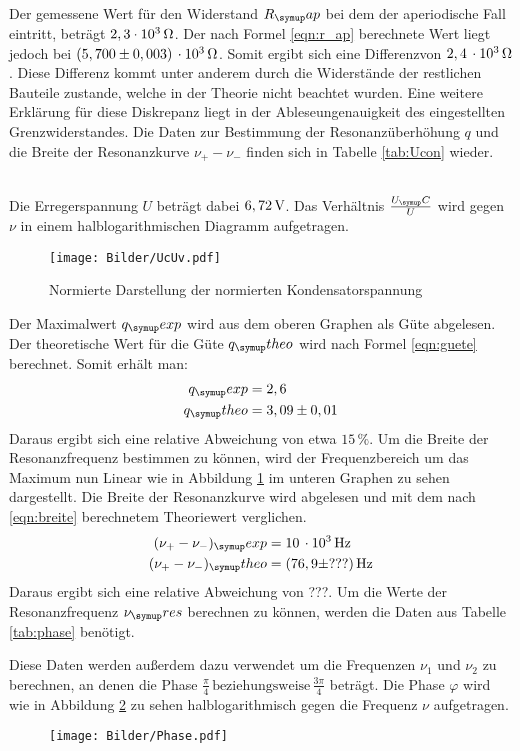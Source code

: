 Der gemessene Wert für den Widerstand $R_\su{ap}$ bei dem der aperiodische Fall
eintritt, beträgt $2,3\cdot 10^3 \,\si{\ohm}$. Der nach Formel \eqref{eqn:r_ap}
berechnete Wert liegt jedoch bei $(5,700 \pm 0,003)\,\cdot 10^3\,\si{\ohm}$. Somit ergibt
sich eine Differenzvon $2,4\,\cdot10^3 \,\si{\ohm}$. Diese Differenz kommt unter anderem durch die Widerstände der
restlichen Bauteile zustande, welche in der Theorie nicht beachtet wurden.
Eine weitere Erklärung für diese Diskrepanz liegt in der Ableseungenauigkeit
des eingestellten Grenzwiderstandes.
\newpage
Die Daten zur Bestimmung der Resonanzüberhöhung $q$ und die Breite der
Resonanzkurve $\nu_+ - \nu_-$ finden sich in Tabelle \ref{tab:Ucon} wieder.

\\
Die Erregerspannung $U$ beträgt dabei $6,72 \,\si{\volt}$.
Das Verhältnis $\frac{U_\su{C}}{U}$ wird gegen $\nu$ in einem halblogarithmischen
Diagramm aufgetragen.
\begin{figure}[h]
  \centering
  \texttt{[image: Bilder/UcUv.pdf]}
  \caption{Normierte Darstellung der normierten Kondensatorspannung}
  \label{fig:UcUv}
\end{figure}
Der Maximalwert $q_\su{exp}$ wird aus dem oberen Graphen als Güte abgelesen. Der
theoretische Wert für die Güte $q_\su{theo}$ wird nach Formel \eqref{eqn:guete} berechnet.
Somit erhält man:
\begin{align*}
  q_\su{exp} &= 2,6 \\
  q_\su{theo} &= 3,09 \pm 0,01
\end{align*}
Daraus ergibt sich eine relative Abweichung von etwa $15\,\si{\percent}$. Um
die Breite der Resonanzfrequenz bestimmen zu können, wird der Frequenzbereich
um das Maximum nun Linear wie in Abbildung \ref{fig:UcUv} im unteren Graphen
zu sehen dargestellt. Die Breite der Resonanzkurve wird abgelesen und mit dem
nach \eqref{eqn:breite} berechnetem Theoriewert verglichen.
\begin{align*}
  (\nu_+ - \nu_-)_\su{exp} &= 10\,\cdot10^3\Hz \\
  (\nu_+ - \nu_-)_\su{theo}&= (76,9 \pm ???)\Hz %
\end{align*}
Daraus ergibt sich eine relative Abweichung von ???.
\newpage
Um die Werte der Resonanzfrequenz $\nu_\su{res}$ berechnen zu können, werden
die Daten aus Tabelle \ref{tab:phase} benötigt.

Diese Daten werden außerdem dazu verwendet um die Frequenzen $\nu_1$ und
$\nu_2$ zu berechnen, an denen die Phase $\frac{\pi}{4}\,\text{beziehungsweise}\,
\frac{3\pi}{4}$ beträgt. Die Phase $\varphi$ wird wie in Abbildung \ref{fig:phse}
zu sehen halblogarithmisch gegen die Frequenz $\nu$ aufgetragen.
\begin{figure}[h]
  \centering
  \texttt{[image: Bilder/Phase.pdf]}
  \caption{}
  \label{fig:phse}
\end{figure}
